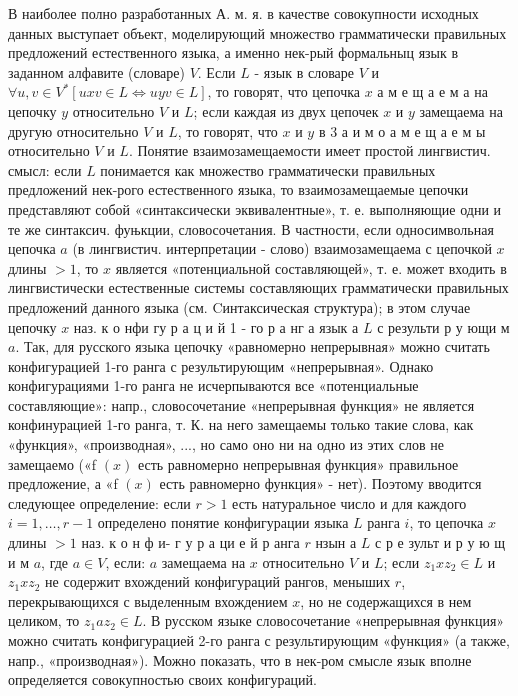 \documentclass[10pt]{article}
\begin{document}
В наиболее полно разработанных А. м. я. в качестве совокупности исходных данных выступает объект, моделирующий множество грамматически правильных предложений естественного языка, а именно нек-рый формальныц язык в заданном алфавите (словаре) $V$. Если $L$ - язык в словаре $V$ и $\forall u, v \in V^{*}[u x v \in L \Leftrightarrow u y v \in L]$, то говорят, что цепочка $x$ а м е щ а е м а на цепочку $y$ относительно $V$ и $L$; если каждая из двух цепочек $x$ и $y$ замещаема на другую относительно $V$ и $L$, то говорят, что $x$ и $y$ в 3 а и м о а м е щ а е м ы относительно $V$ и $L$. Понятие взаимозамещаемости имеет простой лингвистич. смысл: если $L$ понимается как множество грамматически правильных предложений нек-рого естественного языка, то взаимозамещаемые цепочки представляют собой «синтаксически эквивалентные», т. е. выполняющие одни и те же синтаксич. фуњкции, словосочетания. В частности, если односимвольная цепочка $a$ (в лингвистич. интерпретации - слово) взаимозамещаема с цепочкой $x$ длины $>1$, то $x$ является «потенциальной составляющей», т. е. может входить в лингвистически естественные системы составляющих грамматически правильных предложений данного языка (см. Cинтаксическая структура); в этом случае цепочку $x$ наз. к о нфи гу р а ц и й 1 - го р а нг а язык а $L$ с результи р у ющи м $a$. Так, для русского языка цепочку «равномерно непрерывная» можно считать конфигурацией 1-го ранга с результирующим «непрерывная». Однако конфигурациями 1-го ранга не исчерпываются все «потенциальные составляющие»: напр., словосочетание «непрерывная функция» не является конфинурацией 1-го ранга, т. К. на него замещаемы только такие слова, как «функция», «производная», ..., но само оно ни на одно из этих слов не замещаемо («f $(x)$ есть равномерно непрерывная функция» правильное предложение, а «f $(x)$ есть равномерно функция» - нет). Поэтому вводится следующее определение: если $r>1$ есть натуральное число и для каждого $i=1, \ldots, r-1$ определено понятие конфигурации языка $L$ ранга $i$, то цепочка $x$ длины $>1$ наз. к о н ф и- г у р а ци е й р анга $r$ нзын а $L$ с р е зульт и р у ю щ и м $a$, где $a \in V$, если: $a$ замещаема на $x$ относительно $V$ и $L$; если $z_{1} x z_{2} \in L$ и $z_{1} x z_{2}$ не содержит вхождений конфигураций рангов, меныших $r$, перекрывающихся с выделенным вхождением $x$, но не содержащихся в нем целиком, то $z_{1} a z_{2} \in L$. В русском языке словосочетание «непрерывная функция» можно считать конфигурацией 2-го ранга с результирующим «функция» (а также, напр., «производная»). Можно показать, что в нек-ром смысле язык вполне определяется совокупностью своих конфигураций.
\end{document}
